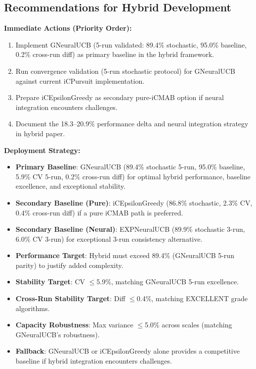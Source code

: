\documentclass[12pt,a4paper]{article}
\begin{document}
\subsection{Recommendations for Hybrid Development}

\textbf{Immediate Actions (Priority Order):}
\begin{enumerate}
\item Implement GNeuralUCB (5-run validated: 89.4\% stochastic, 95.0\% baseline, 0.2\% cross-run diff) as primary baseline in the hybrid framework.
\item Run convergence validation (5-run stochastic protocol) for GNeuralUCB against current iCPursuit implementation.
\item Prepare iCEpsilonGreedy as secondary pure-iCMAB option if neural integration encounters challenges.
\item Document the 18.3--20.9\% performance delta and neural integration strategy in hybrid paper.
\end{enumerate}

\textbf{Deployment Strategy:}
\begin{itemize}
\item \textbf{Primary Baseline}: GNeuralUCB (89.4\% stochastic 5-run, 95.0\% baseline, 5.9\% CV 5-run, 0.2\% cross-run diff) for optimal hybrid performance, baseline excellence, and exceptional stability.
\item \textbf{Secondary Baseline (Pure)}: iCEpsilonGreedy (86.8\% stochastic, 2.3\% CV, 0.4\% cross-run diff) if a pure iCMAB path is preferred.
\item \textbf{Secondary Baseline (Neural)}: EXPNeuralUCB (89.9\% stochastic 3-run, 6.0\% CV 3-run) for exceptional 3-run consistency alternative.
\item \textbf{Performance Target}: Hybrid must exceed 89.4\% (GNeuralUCB 5-run parity) to justify added complexity.
\item \textbf{Stability Target}: CV $\leq$5.9\%, matching GNeuralUCB 5-run excellence.
\item \textbf{Cross-Run Stability Target}: Diff $\leq$0.4\%, matching EXCELLENT grade algorithms.
\item \textbf{Capacity Robustness}: Max variance $\leq$5.0\% across scales (matching GNeuralUCB's robustness).
\item \textbf{Fallback}: GNeuralUCB or iCEpsilonGreedy alone provides a competitive baseline if hybrid integration encounters challenges.
\end{itemize}
\end{document}
